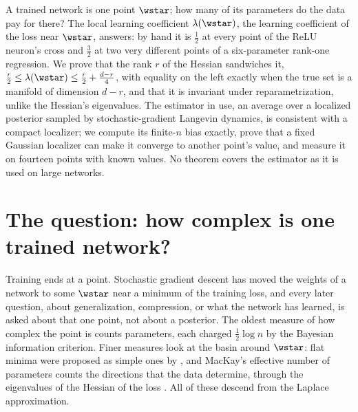 \newcommand{\llcpost}[1]{\mathbb{E}_{w\mid\wstar,\beta,\gamma}\!\left[#1\right]}
\newcommand{\llcpop}[1]{\mathbb{E}_{t}\!\left[#1\right]}
\newcommand{\llcB}{\mathcal{B}}

\begin{refsection}

\begin{chaptersummary}
A trained network is one point $\wstar$; how many of its parameters do the data pay for there? The local learning coefficient $\lambda(\wstar)$, the learning coefficient of the loss near $\wstar$, answers: by hand it is $\tfrac12$ at every point of the ReLU neuron's cross and $\tfrac32$ at two very different points of a six-parameter rank-one regression. We prove that the rank $r$ of the Hessian sandwiches it, $\tfrac r2\le\lambda(\wstar)\le\tfrac r2+\tfrac{d-r}4$, with equality on the left exactly when the true set is a manifold of dimension $d-r$, and that it is invariant under reparametrization, unlike the Hessian's eigenvalues. The estimator in use, an average over a localized posterior sampled by stochastic-gradient Langevin dynamics, is consistent with a compact localizer; we compute its finite-$n$ bias exactly, prove that a fixed Gaussian localizer can make it converge to another point's value, and measure it on fourteen points with known values. No theorem covers the estimator as it is used on large networks.
\end{chaptersummary}

\section{The question: how complex is one trained network?}\label{sec:llc:question}

Training ends at a point. Stochastic gradient descent has moved the weights of a network to some $\wstar$ near a minimum of the training loss, and every later question, about generalization, compression, or what the network has learned, is asked about that one point, not about a posterior. The oldest measure of how complex the point is counts parameters, each charged $\tfrac12\log n$ by the Bayesian information criterion. Finer measures look at the basin around $\wstar$: flat minima were proposed as simple ones by \textcite{HochreiterSchmidhuber1997}, and MacKay's effective number of parameters counts the directions that the data determine, through the eigenvalues of the Hessian of the loss \parencite{MacKay1992a}. All of these descend from the Laplace approximation.


\end{refsection}
